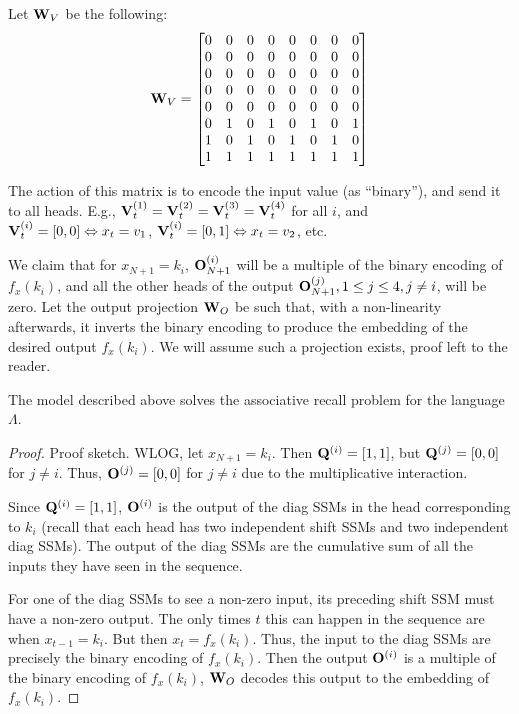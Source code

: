 Let $\mathbf{W}_V$ be the following:
$$
    \mathbf{W}_V = \begin{bmatrix}
        0 & 0 & 0 & 0 & 0 & 0 & 0 & 0 \\
        0 & 0 & 0 & 0 & 0 & 0 & 0 & 0 \\
        0 & 0 & 0 & 0 & 0 & 0 & 0 & 0 \\
        0 & 0 & 0 & 0 & 0 & 0 & 0 & 0 \\
        0 & 0 & 0 & 0 & 0 & 0 & 0 & 0 \\
        0 & 1 & 0 & 1 & 0 & 1 & 0 & 1 \\
        1 & 0 & 1 & 0 & 1 & 0 & 1 & 0 \\
        1 & 1 & 1 & 1 & 1 & 1 & 1 & 1 \\
    \end{bmatrix}
$$
\begin{remark}
The action of this matrix is to encode the input value (as ``binary''), and send it to all \hthree heads.
E.g., $\mathbf{V}_t^{(1)} = \mathbf{V}_t^{(2)} = \mathbf{V}_t^{(3)} = \mathbf{V}_t^{(4)}$ for all $i$, and $\mathbf{V}_t^{(i)} = [0, 0] \Leftrightarrow x_t = v_1$, $\mathbf{V}_t^{(i)} = [0, 1] \Leftrightarrow x_t = v_2$, etc.
\end{remark}

We claim that for $x_{N+1} = k_i$, $\mathbf{O}_{N+1}^{(i)}$ will be a multiple of the binary encoding of $f_x(k_i)$, and all the other heads of the output $\mathbf{O}_{N+1}^{(j)}, 1 \leq j \leq 4, j \neq i$, will be zero.
Let the output projection $\mathbf{W}_O$ be such that, with a non-linearity afterwards, it inverts the binary encoding to produce the embedding of the desired output $f_x(k_i)$.
We will assume such a projection exists, proof left to the reader.

\begin{proposition}\label{thm:h3_expressivity}
    The model described above solves the associative recall problem for the language $\Lambda$.
\end{proposition}

\begin{proof}
Proof sketch.
WLOG, let $x_{N+1} = k_i$.
Then $\mathbf{Q}^{(i)} = [1, 1]$, but $\mathbf{Q}^{(j)} = [0, 0]$ for $j \neq i$.
Thus, $\mathbf{O}^{(j)} = [0, 0]$ for $j \neq i$ due to the multiplicative interaction.

Since $\mathbf{Q}^{(i)} = [1, 1]$, $\mathbf{O}^{(i)}$ is the output of the diag SSMs in the \hthree head corresponding to $k_i$ (recall that each head has two independent shift SSMs and two independent diag SSMs).
The output of the diag SSMs are the cumulative sum of all the inputs they have seen in the sequence.

For one of the diag SSMs to see a non-zero input, its preceding shift SSM must have a non-zero output.
The only times $t$ this can happen in the sequence are when $x_{t-1} = k_i$.
But then $x_t = f_x(k_i)$.
Thus, the input to the diag SSMs are precisely the binary encoding of $f_x(k_i)$.
Then the output $\mathbf{O}^{(i)}$ is a multiple of the binary encoding of $f_x(k_i)$, $\mathbf{W}_O$ decodes this output to the embedding of $f_x(k_i)$.
\end{proof}

